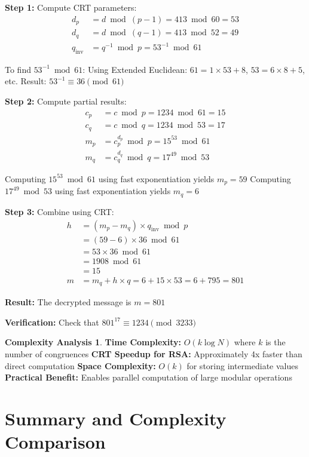 \documentclass[12pt,a4paper]{article}
\theoremstyle{definition}
\newtheorem{complexity}{Complexity Analysis}[section]
\begin{document}
\textbf{Step 1:} Compute CRT parameters:
\begin{align}
d_p &= d \bmod (p-1) = 413 \bmod 60 = 53\\
d_q &= d \bmod (q-1) = 413 \bmod 52 = 49\\
q_{\text{inv}} &= q^{-1} \bmod p = 53^{-1} \bmod 61
\end{align}

To find $53^{-1} \bmod 61$:
Using Extended Euclidean: $61 = 1 \times 53 + 8$, $53 = 6 \times 8 + 5$, etc.
Result: $53^{-1} \equiv 36 \pmod{61}$

\textbf{Step 2:} Compute partial results:
\begin{align}
c_p &= c \bmod p = 1234 \bmod 61 = 15\\
c_q &= c \bmod q = 1234 \bmod 53 = 17\\
m_p &= c_p^{d_p} \bmod p = 15^{53} \bmod 61\\
m_q &= c_q^{d_q} \bmod q = 17^{49} \bmod 53
\end{align}

Computing $15^{53} \bmod 61$ using fast exponentiation yields $m_p = 59$
Computing $17^{49} \bmod 53$ using fast exponentiation yields $m_q = 6$

\textbf{Step 3:} Combine using CRT:
\begin{align}
h &= (m_p - m_q) \times q_{\text{inv}} \bmod p\\
  &= (59 - 6) \times 36 \bmod 61\\
  &= 53 \times 36 \bmod 61\\
  &= 1908 \bmod 61\\
  &= 15\\
m &= m_q + h \times q = 6 + 15 \times 53 = 6 + 795 = 801
\end{align}

\textbf{Result:} The decrypted message is $m = 801$

\textbf{Verification:} Check that $801^{17} \equiv 1234 \pmod{3233}$

\begin{complexity}
\textbf{Time Complexity:} $O(k \log N)$ where $k$ is the number of congruences
\textbf{CRT Speedup for RSA:} Approximately 4x faster than direct computation
\textbf{Space Complexity:} $O(k)$ for storing intermediate values
\textbf{Practical Benefit:} Enables parallel computation of large modular operations
\end{complexity}

\section{Summary and Complexity Comparison}
\end{document}
